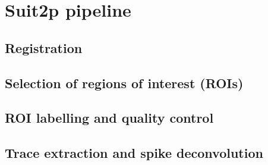 \section{Suit2p pipeline}
\label{sec:sectionb}

\subsection{Registration}
\label{subsec:subasectionA}

\subsection{Selection of regions of interest (ROIs)}

\subsection{ROI labelling and quality control}

\subsection{Trace extraction and spike deconvolution}